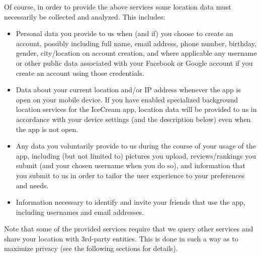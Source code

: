 \documentclass{article}
\providecommand{\tightlist}{
    \setlength{\itemsep}{0pt}\setlength{\parskip}{0pt}
}
\begin{document}
Of course, in order to provide the above services some location data must necessarily be collected and analyzed. This includes:
\begin{itemize}\tightlist
  \item Personal data you provide to us when (and if) you choose to create an account, possibly including full name, email address, phone number, birthday, gender, city/location on account creation, and where applicable any username or other public data associated with your Facebook or Google account if you create an account using those credentials.
  \item Data about your current location and/or IP address whenever the app is open on your mobile device. If you have enabled specialized background location services for the IceCream app, location data will be provided to us in accordance with your device settings (and the description below) even when the app is not open.
  \item Any data you voluntarily provide to us during the course of your usage of the app, including (but not limited to) pictures you upload, reviews/rankings you submit (and your chosen username when you do so), and information that you submit to us in order to tailor the user experience to your preferences and needs.
  \item Information necessary to identify and invite your friends that use the app, including usernames and email addresses.
\end{itemize}

Note that some of the provided services require that we query other services and share your location with 3rd-party entities. This is done in such a way as to maximize privacy (see the following sections for details).
\end{document}
